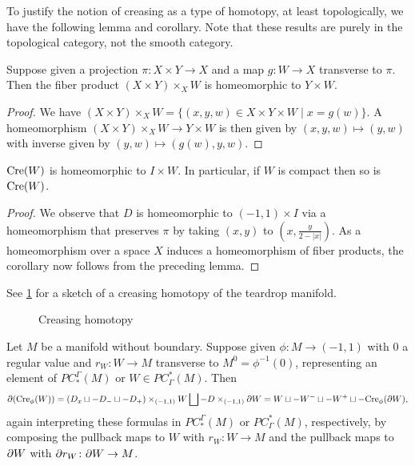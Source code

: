 To justify the notion of creasing as a type of homotopy, at least topologically, we have the following lemma and corollary.
Note that these results are purely in the topological category, not the smooth category.

\begin{lemma}
	Suppose given a projection $\pi \colon X \times Y \to X$ and a map $g \colon W \to X$ transverse to $\pi$.
	Then the fiber product $(X \times Y) \times_X W$ is homeomorphic to $Y \times W$.
\end{lemma}

\begin{proof}
	We have $(X \times Y) \times_X W = \{(x,y,w) \in X \times Y \times W \mid x = g(w)\}$.
	A homeomorphism $(X \times Y) \times_X W \to Y \times W$ is then given by $(x,y,w) \mapsto (y,w)$ with inverse given by $(y,w) \mapsto (g(w),y,w)$.
\end{proof}

\begin{corollary}
	$\mathrm{Cre}(W)$ is homeomorphic to $I \times W$. In particular, if $W$ is compact then so is $\mathrm{Cre}(W)$.
\end{corollary}

\begin{proof}
	We observe that $D$ is homeomorphic to $(-1,1) \times I$ via a homeomorphism that preserves $\pi$ by taking $(x,y)$ to $\left(x, \frac{y}{2-|x|}\right)$.
	As a homeomorphism over a space $X$ induces a homeomorphism of fiber products, the corollary now follows from the preceding lemma.
\end{proof}


See \cref{F: creasing} for a sketch of a creasing homotopy of the teardrop manifold. 

\begin{figure}[h!]
	
	\caption{Creasing homotopy}
	\label{F: creasing}
\end{figure}

\begin{lemma}\label{E: bd crease}
	Let $M$ be a manifold without boundary.
	Suppose given $\phi \colon M \to (-1,1)$ with $0$ a regular value and $r_W \colon W \to M$ transverse to $M^0 = \phi^{-1}(0)$, representing an element of $PC^\Gamma_*(M)$ or $W \in PC_\Gamma^*(M)$.
	Then
\begin{equation*}
	\partial(\mathrm{Cre}_\phi(W)) = (D_x \sqcup -D_- \sqcup -D_+)\times_{(-1,1)} W \bigsqcup -D\times_{(-1,1)}\partial W = W \sqcup -W^- \sqcup -W^+ \sqcup -\mathrm{Cre}_\phi(\partial W),
\end{equation*}
	again interpreting these formulas in $PC^\Gamma_*(M)$ or $PC_\Gamma^*(M)$, respectively, by composing the pullback maps to $W$ with $r_W \colon W \to M$ and the pullback maps to $\partial W$ with $\partial r_W \colon \partial W \to M$.
\end{lemma}

